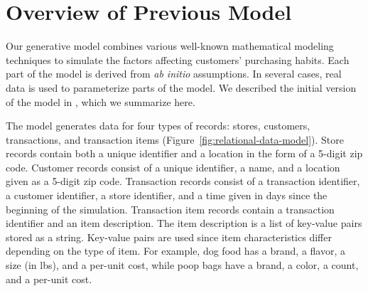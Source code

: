 \documentclass[conference]{IEEEtran}
\begin{document}


\section{Overview of Previous Model}
Our generative model combines various well-known mathematical modeling techniques to simulate the factors affecting customers' purchasing habits.  Each part of the model is derived from \emph{ab initio} assumptions.  In several cases, real data is used to parameterize parts of the model. We described the initial version of the model in \cite{Nowling2014}, which we summarize here.

The model generates data for four types of records: stores, customers, transactions, and transaction items (Figure~\ref{fig:relational-data-model}).  Store records contain both a unique identifier and a location in the form of a 5-digit zip code. Customer records consist of a unique identifier, a name, and a location given as a 5-digit zip code. Transaction records consist of a transaction identifier, a customer identifier, a store identifier, and a time given in days since the beginning of the simulation. Transaction item records contain a transaction identifier and an item description.  The item description is a list of key-value pairs stored as a string.  Key-value pairs are used since item characteristics differ depending on the type of item.  For example, dog food has a brand, a flavor, a size (in lbs), and a per-unit cost, while poop bags have a brand, a color, a count, and a per-unit cost.
\end{document}
